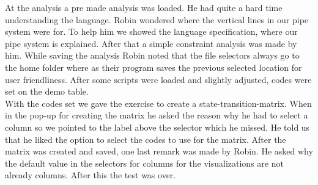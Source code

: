 \begin{itemize}
At the analysis a pre made analysis was loaded. He had quite a hard time understanding the language. Robin wondered where the vertical lines in our pipe system were for. To help him we showed the language specification, where our pipe system is explained. After that a simple constraint analysis was made by him. While saving the analysis Robin noted that the file selectors always go to the home folder where as their program saves the previous selected location for user friendliness. After some scripts were loaded and slightly adjusted, codes were set on the demo table. \\
With the codes set we gave the exercise to create a state-transition-matrix. When in the pop-up for creating the matrix he asked the reason why he had to select a column so we pointed to the label above the selector which he missed. He told us that he liked the option to select the codes to use for the matrix. After the matrix was created and saved, one last remark was made by Robin. He asked why the default value in the selectors for columns for the visualizations are not already columns. After this the test was over. 
\end{itemize}